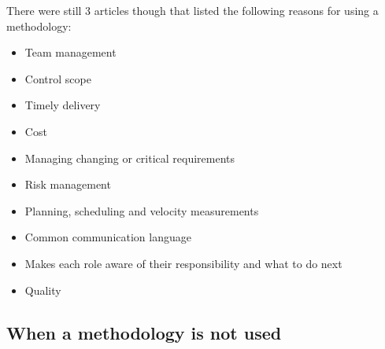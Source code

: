 There were still 3 articles though that listed the following reasons for using a methodology:  
\begin{itemize}
    \item Team management \cite{lucena_2008}
    \item Control scope \cite{lucena_2008}
    \item Timely delivery \cite{lucena_2008, garg_2015}
    \item Cost \cite{lucena_2008, uzturk_2013, garg_2015}
    \item Managing changing or critical requirements \cite{lucena_2008, uzturk_2013}
    \item Risk management \cite{lucena_2008, uzturk_2013, garg_2015}
    \item Planning, scheduling and velocity measurements \cite{uzturk_2013}
    \item Common communication language \cite{uzturk_2013}
    \item Makes each role aware of their responsibility and what to do next \cite{uzturk_2013}
    \item Quality \cite{garg_2015}
\end{itemize}

\subsection{When a methodology is not used}
